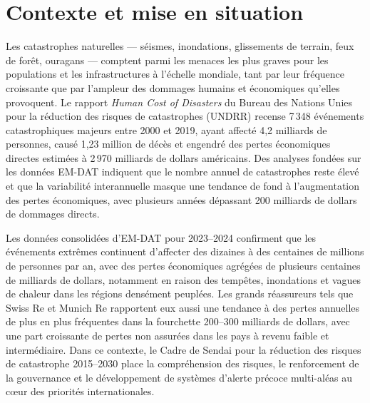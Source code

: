 \label{sec:Introduction}

\section{Contexte et mise en situation}\label{sec:Contexte}

Les catastrophes naturelles — séismes, inondations, glissements de terrain, feux de forêt, ouragans — comptent parmi les menaces les plus graves pour les populations et les infrastructures à l'échelle mondiale, tant par leur fréquence croissante que par l'ampleur des dommages humains et économiques qu'elles provoquent\cite{undrr2020,noauthor_disaster_nodate}. Le rapport \emph{Human Cost of Disasters} du Bureau des Nations Unies pour la réduction des risques de catastrophes (UNDRR) recense 7\,348 événements catastrophiques majeurs entre 2000 et 2019, ayant affecté 4{,}2 milliards de personnes, causé 1{,}23 million de décès et engendré des pertes économiques directes estimées à 2\,970 milliards de dollars américains\cite{undrr2020}. Des analyses fondées sur les données EM-DAT indiquent que le nombre annuel de catastrophes reste élevé et que la variabilité interannuelle masque une tendance de fond à l'augmentation des pertes économiques, avec plusieurs années dépassant 200 milliards de dollars de dommages directs\cite{noauthor_number_nodate,burgueno_salas_global_nodate}.

Les données consolidées d'EM-DAT pour 2023--2024 confirment que les événements extrêmes continuent d'affecter des dizaines à des centaines de millions de personnes par an, avec des pertes économiques agrégées de plusieurs centaines de milliards de dollars, notamment en raison des tempêtes, inondations et vagues de chaleur dans les régions densément peuplées\cite{noauthor_number_nodate,burgueno_salas_global_nodate}. Les grands réassureurs tels que Swiss Re et Munich Re rapportent eux aussi une tendance à des pertes annuelles de plus en plus fréquentes dans la fourchette 200--300 milliards de dollars, avec une part croissante de pertes non assurées dans les pays à revenu faible et intermédiaire\cite{swiss_re_2025,munich_re_2025}. Dans ce contexte, le Cadre de Sendai pour la réduction des risques de catastrophe 2015--2030 place la compréhension des risques, le renforcement de la gouvernance et le développement de systèmes d'alerte précoce multi-aléas au cœur des priorités internationales\cite{UNDRR2015Sendai}.

